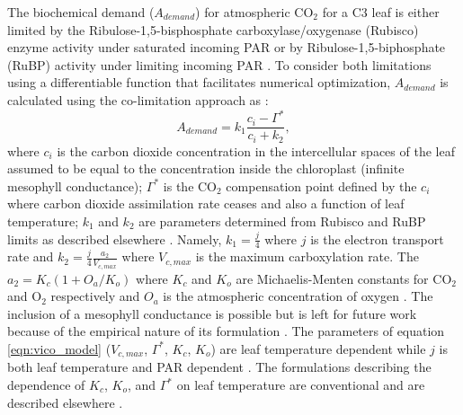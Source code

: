 \documentclass[utf8]{frontiersSCNS} %
\begin{document}
The biochemical demand ($A_{demand}$) for atmospheric CO$_2$ for a C3 leaf is either limited by the Ribulose-1,5-bisphosphate carboxylase/oxygenase (Rubisco) enzyme activity under saturated incoming PAR or by Ribulose-1,5-biphosphate (RuBP) activity under limiting incoming PAR \citep{farquhar_biochemical_1980}. To consider both limitations using a differentiable function that facilitates numerical optimization, $A_{demand}$ is calculated using the co-limitation approach as \citep{vico_perspective_2013}:
\begin{equation}
    \label{eqn:vico_model}
    A_{demand} = k_1 \frac{c_i - \Gamma^*}{c_i + k_2},
\end{equation}
where $c_i$ is the carbon dioxide concentration in the intercellular spaces of the leaf assumed to be equal to the concentration inside the chloroplast (infinite mesophyll conductance); $\Gamma^*$ is the CO$_2$ compensation point defined by the $c_i$ where carbon dioxide assimilation rate ceases and also a function of leaf temperature; $k_1$ and $k_2$ are parameters determined from Rubisco and RuBP limits as described elsewhere \citep{vico_perspective_2013}. Namely, $k_1 = \frac{j}{4}$ where $j$ is the electron transport rate and $k_2 = \frac{j}{4} \frac{a_2}{V_{c,max}}$ where $V_{c,max}$ is the maximum carboxylation rate. The $a_2 = K_c (1+O_a/K_o)$ where $K_c$ and $K_o$ are Michaelis-Menten constants for CO$_2$ and O$_2$ respectively and $O_a$ is the atmospheric concentration of oxygen \citep{bernacchi_improved_2001}. The inclusion of a mesophyll conductance is possible but is left for future work because of the empirical nature of its formulation \citep{dewar2018new}. The parameters of equation \ref{eqn:vico_model} ($V_{c,max}$, $\Gamma^*$, $K_c$, $K_o$) are leaf temperature dependent while $j$ is both leaf temperature and PAR dependent \citep{medlyn_temperature_2002}. The formulations describing the dependence of $K_c$, $K_o$, and $\Gamma^*$ on leaf temperature are conventional and are described elsewhere \citep{bernacchi_improved_2001}. 

\end{document}
